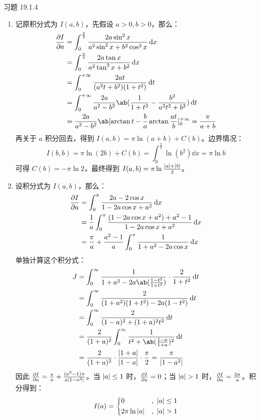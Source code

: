 \begin{problem}
	习题 19.1.4
	\begin{solution}
		\begin{enumerate}
			\item[\textbf{1)}] 记原积分式为 $I(a, b)$，先假设 $a > 0, b > 0$，那么：
			$$
			\begin{aligned}
				\pdv{I}{a} & = \int_{0}^{\frac{\pi}{2}} \frac{2 a \sin^2 x}{a^2 \sin^2 x + b^2 \cos^2 x} \dd{x} \\
				& = \int_{0}^{\frac{\pi}{2}} \frac{2 a \tan x}{a^2 \tan^2 x + b^2} \dd{x} \\
				& = \int_{0}^{+\infty} \frac{2 a t}{(a^2 t + b^2)(1 + t^2)} \dd{t} \\
				& = \int_{0}^{+\infty} \frac{2a}{a^2 - b^2} \ab(\frac{1}{1 + t^2} - \frac{b^2}{a^2 t^2 + b^2}) \dd{t} \\
				& = \frac{2a}{a^2 - b^2} \ab[\arctan t - \frac{b}{a} \arctan \frac{a t}{b}]_{0}^{+\infty} = \frac{\pi}{a + b}
			\end{aligned}
			$$
			再关于 $a$ 积分回去，得到 $I(a, b) = \pi \ln (a + b) + C(b)$。边界情况：
			$$
			I(b, b) = \pi \ln (2 b) + C(b) = \int_{0}^{\frac{\pi}{2}} \ln (b^2) \dd{x} = \pi \ln b
			$$
			可得 $C(b) = -\pi \ln 2$，最终得到 $I(a, b) = \pi \ln \frac{\abs{a} + \abs{b}}{2}$。

			\item[\textbf{2)}] 设积分式为 $I(a, b)$，那么：
			$$
			\begin{aligned}
				\pdv{I}{a} & = \int_{0}^{\pi} \frac{2 a - 2 \cos x}{1 - 2 a \cos x + a^2} \dd{x} \\
				& = \frac{1}{a} \int_{0}^{\pi} \frac{(1 - 2a \cos x + a^2) + a^2 - 1}{1 - 2a \cos x + a^2} \dd{x} \\
				& = \frac{\pi}{a} + \frac{a^2 - 1}{a} \int_0^\pi \frac{1}{1 + a^2 - 2a \cos x} \dd{x}
			\end{aligned}
			$$
			单独计算这个积分式：
			$$
			\begin{aligned}
				J & = \int_{0}^{\infty} \frac{1}{1 + a^2 - 2a\ab(\frac{1 - t^2}{1 + t^2})} \cdot \frac{2}{1 + t^2} \dd{t} \\
				& = \int_{0}^{\infty} \frac{2}{(1 + a^2) (1 + t^2) - 2a (1 - t^2)} \dd{t} \\
				& = \int_{0}^{\infty} \frac{2}{(1 - a)^2 + (1 + a)^2 t^2} \dd{t} \\
				& = \frac{2}{(1 + a)^2} \int_{0}^{\infty} \frac{1}{t^2 + \ab(\frac{1 - a}{1 + a})^2} \dd{t} \\
				& = \frac{2}{(1 + a)^2} \cdot \frac{\abs{1 + a}}{\abs{1 - a}} \cdot \frac{\pi}{2} = \frac{\pi}{\abs{1 - a^2}}
			\end{aligned}
			$$
			因此 $\pdv{I}{a} = \frac{\pi}{a} + \frac{(a^2 - 1) \pi}{a \abs{1 - a^2}}$。当 $\abs{a} \le 1$ 时，$\pdv{I}{a} = 0$；当 $\abs{a} > 1$ 时，$\pdv{I}{a} = \frac{2\pi}{a}$。积分得到：
			$$
			I(a) = \begin{dcases}
				0 &,\ \abs{a} \le 1 \\
				2 \pi \ln \abs{a} &,\ \abs{a} > 1
			\end{dcases}
			$$
		\end{enumerate}
	\end{solution}
\end{problem}